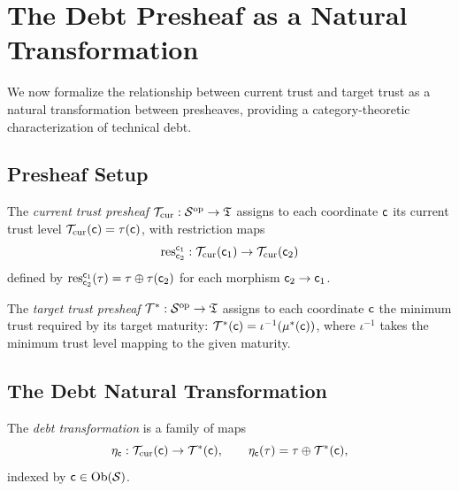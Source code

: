\documentclass[11pt]{article}
\begin{document}
\section{The Debt Presheaf as a Natural Transformation}%
\label{sec:debt-nat-trans}

We now formalize the relationship between current trust and target
trust as a natural transformation between presheaves, providing a
category-theoretic characterization of technical debt.

\subsection{Presheaf Setup}\label{subsec:presheaf-setup}

\begin{definition}\label{def:current-presheaf}
The \emph{current trust presheaf}
$\mathcal{T}_{\mathrm{cur}} : \mathcal{S}^{\mathrm{op}} \to \mathfrak{T}$ assigns
to each coordinate $\mathsf{c}$ its current trust level
$\mathcal{T}_{\mathrm{cur}}(\mathsf{c}) = \tau(\mathsf{c})$, with restriction
maps
\[
  \mathrm{res}^{\mathsf{c}_1}_{\mathsf{c}_2} : \mathcal{T}_{\mathrm{cur}}(\mathsf{c}_1)
  \to \mathcal{T}_{\mathrm{cur}}(\mathsf{c}_2)
\]
defined by $\mathrm{res}^{\mathsf{c}_1}_{\mathsf{c}_2}(\tau) = \tau \oplus
\tau(\mathsf{c}_2)$ for each morphism $\mathsf{c}_2 \to \mathsf{c}_1$.
\end{definition}

\begin{definition}\label{def:target-presheaf}
The \emph{target trust presheaf}
$\mathcal{T}^* : \mathcal{S}^{\mathrm{op}} \to \mathfrak{T}$ assigns to each
coordinate $\mathsf{c}$ the minimum trust required by its target
maturity: $\mathcal{T}^*(\mathsf{c}) = \iota^{-1}(\mu^*(\mathsf{c}))$,
where $\iota^{-1}$ takes the minimum trust level mapping to the
given maturity.
\end{definition}

\subsection{The Debt Natural Transformation}%
\label{subsec:debt-nat-trans}

\begin{definition}\label{def:debt-transform}
The \emph{debt transformation} is a family of maps
\[
  \eta_{\mathsf{c}} : \mathcal{T}_{\mathrm{cur}}(\mathsf{c}) \to
  \mathcal{T}^*(\mathsf{c}), \qquad
  \eta_{\mathsf{c}}(\tau) = \tau \oplus \mathcal{T}^*(\mathsf{c}),
\]
indexed by $\mathsf{c} \in \mathrm{Ob}(\mathcal{S})$.
\end{definition}
\end{document}
